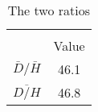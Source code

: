 \begin{table}[htbp]\centering
\def\sym#1{\ifmmode^{#1}\else\(^{#1}\)\fi}
\caption{The two ratios}
\begin{tabular}{l*{1}{c}}
\toprule
                    &\multicolumn{1}{c}{}\\
                    &       Value\\
\midrule
$\bar{D}/\bar{H}$   &        46.1\\
$\overline{D/H}$    &        46.8\\
\bottomrule
\end{tabular}
\end{table}
